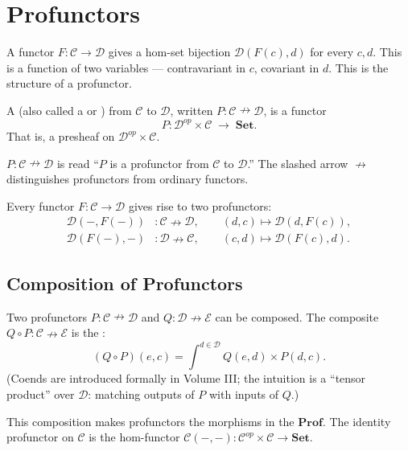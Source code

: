 \section{Profunctors}

A functor $F : \mathcal{C} \to \mathcal{D}$ gives a hom-set bijection
$\mathcal{D}(F(c), d)$ for every $c, d$. This is a function of two variables —
contravariant in $c$, covariant in $d$. This is the structure of a profunctor.

\begin{definition}
A  (also called a  or )
from $\mathcal{C}$ to $\mathcal{D}$, written $P : \mathcal{C} \nrightarrow \mathcal{D}$,
is a functor
\[
  P : \mathcal{D}^{op} \times \mathcal{C} \;\to\; \mathbf{Set}.
\]
That is, a presheaf on $\mathcal{D}^{op} \times \mathcal{C}$.
\end{definition}

\begin{howtosay}
$P : \mathcal{C} \nrightarrow \mathcal{D}$ is read ``$P$ is a profunctor from
$\mathcal{C}$ to $\mathcal{D}$.'' The slashed arrow $\nrightarrow$ distinguishes
profunctors from ordinary functors.
\end{howtosay}

Every functor $F : \mathcal{C} \to \mathcal{D}$ gives rise to two profunctors:
\begin{align*}
  \mathcal{D}(-, F(-)) &: \mathcal{C} \nrightarrow \mathcal{D},
  \qquad (d, c) \mapsto \mathcal{D}(d, F(c)), \\
  \mathcal{D}(F(-), -) &: \mathcal{D} \nrightarrow \mathcal{C},
  \qquad (c, d) \mapsto \mathcal{D}(F(c), d).
\end{align*}

\subsection{Composition of Profunctors}

Two profunctors $P : \mathcal{C} \nrightarrow \mathcal{D}$ and
$Q : \mathcal{D} \nrightarrow \mathcal{E}$ can be composed. The composite
$Q \circ P : \mathcal{C} \nrightarrow \mathcal{E}$ is the :
\[
  (Q \circ P)(e, c) = \int^{d \in \mathcal{D}} Q(e, d) \times P(d, c).
\]
(Coends are introduced formally in Volume III; the intuition is a ``tensor
product'' over $\mathcal{D}$: matching outputs of $P$ with inputs of $Q$.)

This composition makes profunctors the morphisms in the  $\mathbf{Prof}$. The identity profunctor on $\mathcal{C}$ is
the hom-functor $\mathcal{C}(-, -) : \mathcal{C}^{op} \times \mathcal{C} \to \mathbf{Set}$.

